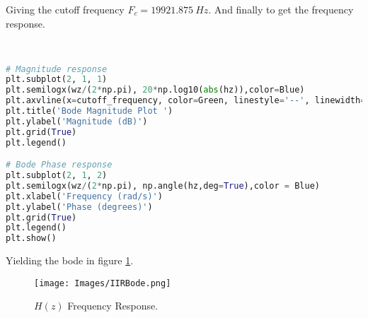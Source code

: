 Giving the cutoff frequency $F_c = 19921.875~Hz$. And finally to get the frequency response.

\begin{lstlisting}[language=python, caption = Specification Definition]


# Magnitude response
plt.subplot(2, 1, 1)
plt.semilogx(wz/(2*np.pi), 20*np.log10(abs(hz)),color=Blue)
plt.axvline(x=cutoff_frequency, color=Green, linestyle='--', linewidth=1)
plt.title('Bode Magnitude Plot ')
plt.ylabel('Magnitude (dB)')
plt.grid(True)
plt.legend()

# Bode Phase response
plt.subplot(2, 1, 2)
plt.semilogx(wz/(2*np.pi), np.angle(hz,deg=True),color = Blue)
plt.xlabel('Frequency (rad/s)')
plt.ylabel('Phase (degrees)')
plt.grid(True)
plt.legend()
plt.show()

\end{lstlisting}

Yielding the bode in figure \ref{fig:IIRBode}.

\begin{figure}[H]
    \centering
    \texttt{[image: Images/IIRBode.png]}
    \caption{$H(z)$ Frequency Response.}
    \label{fig:IIRBode}
\end{figure}

